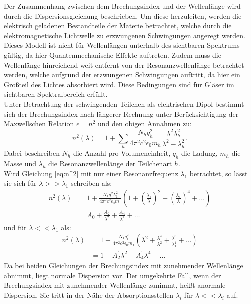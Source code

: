 Der Zusammenhang zwischen dem Brechungsindex und der Wellenlänge wird durch die Dispersionsgleichung beschrieben. Um diese herzuleiten, werden die elektrisch geladenen Bestandteile der Materie betrachtet, welche durch die elektromagnetische Lichtwelle zu erzwungenen Schwingungen angeregt werden. Dieses Modell ist nicht für Wellenlängen unterhalb des sichtbaren Spektrums gültig, da hier Quantenmechanische Effekte auftreten. Zudem muss die Wellenlänge hinreichend weit entfernt von der Resonanzwellenlänge betrachtet werden, welche aufgrund der erzwungenen Schwingungen auftritt, da hier ein Großteil des Lichtes absorbiert wird. Diese Bedingungen sind für Gläser im sichtbaren Spektralbereich erfüllt.\\
Unter Betrachtung der schwingenden Teilchen als elektrischen Dipol bestimmt sich der Brechungsindex nach längerer Rechnung unter Berücksichtigung der Maxwellschen Relation $\epsilon=n^2$ und den obigen Annahmen zu:
\begin{equation}
n^2(\lambda)=1+\sum_h\frac{N_hq^2_h}{4\pi^2 c^2\epsilon_0 m_h}\frac{\lambda^2\lambda^2_h}{\lambda^2-\lambda^2_h}\text{.}\label{eq:n^2}
\end{equation}
Dabei beschreiben $N_h$ die Anzahl pro Volumeneinheit, $q_h$ die Ladung, $m_h$ die Masse und $\lambda_h$ die Resonanzwellenlänge der Teilchenart $h$. \\
Wird Gleichung \eqref{eq:n^2} mit nur einer Resonanzfrequenz $\lambda_1$ betrachtet, so lässt sie sich für $\lambda >>\lambda_1$ schreiben als:
\begin{align}
n^2(\lambda)&=1+\frac{N_1 q_1^2 \lambda_1^2}{4\pi^2 c^2 \epsilon_0 m_1}\left(1+\left(\frac{\lambda_1}{\lambda}\right)^2+\left(\frac{\lambda_1}{\lambda}\right)^4+\ldots\right)\nonumber\\
			&=A_0+\frac{A_2}{\lambda^2}+\frac{A_4}{\lambda^4}+\ldots\label{eq:n^2 für l>>l1}
\end{align} 
und für $\lambda <<\lambda_1$ als:
\begin{align}
n^2(\lambda)&=1-\frac{N_1 q_1^2 }{4\pi^2 c^2 \epsilon_0 m_1}\left(\lambda^2+\frac{\lambda^4}{\lambda_1^2}+\frac{\lambda^6}{\lambda_1^4}+\ldots\right)\nonumber\\
			&=1-A_2^\prime\lambda^2-A_4^\prime\lambda^4-\ldots\label{eq:n^2 für l<<l1}
\end{align} 
Da bei beiden Gleichungen der Brechungsindex mit zunehmender Wellenlänge abnimmt, liegt normale Dispersion vor. Der umgekehrte Fall, wenn der Brechungsindex mit zunehmender Wellenlänge zunimmt, heißt anormale Dispersion. Sie tritt in der Nähe der Absorptionsstellen $\lambda_i$ für $\lambda <<\lambda_i$ auf.

